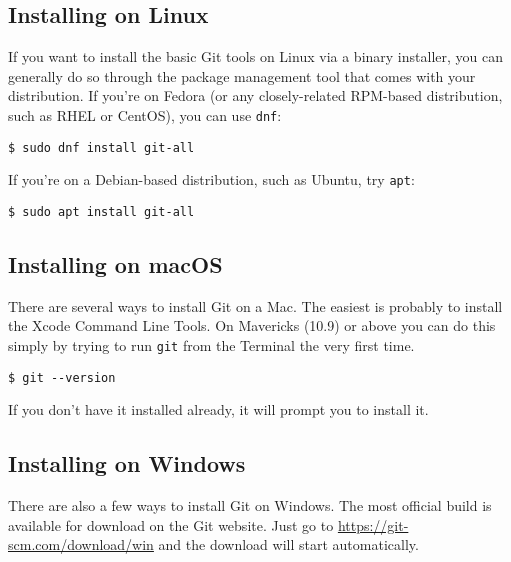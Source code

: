 \documentclass{article}
\begin{document}
\subsection{Installing on Linux}

If you want to install the basic Git tools on Linux via a binary installer, you can generally do so through the package management tool that comes with your distribution. If you’re on Fedora (or any closely-related RPM-based distribution, such as RHEL or CentOS), you can use \texttt{dnf}:

\begin{lstlisting}
$ sudo dnf install git-all
\end{lstlisting}


If you’re on a Debian-based distribution, such as Ubuntu, try \texttt{apt}:

\begin{lstlisting}
$ sudo apt install git-all
\end{lstlisting}

\subsection{Installing on macOS}

There are several ways to install Git on a Mac. The easiest is probably to install the Xcode Command Line Tools. On Mavericks (10.9) or above you can do this simply by trying to run \texttt{git} from the Terminal the very first time.

\begin{lstlisting}
$ git --version
\end{lstlisting}
If you don’t have it installed already, it will prompt you to install it.

\subsection{Installing on Windows}

There are also a few ways to install Git on Windows. The most official build is available for download on the Git website. Just go to \url{https://git-scm.com/download/win} and the download will start automatically. 
\end{document}
